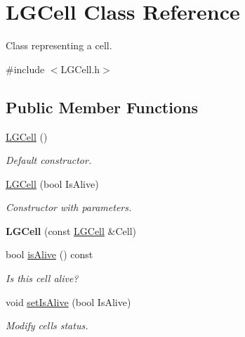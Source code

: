 \hypertarget{class_l_g_cell}{}\section{L\+G\+Cell Class Reference}
\label{class_l_g_cell}


Class representing a cell.  




{\ttfamily \#include $<$L\+G\+Cell.\+h$>$}

\subsection*{Public Member Functions}
\begin{DoxyCompactItemize}
\item 
\hyperlink{class_l_g_cell_a00bae879e0f080c65dc95d5bea436030}{L\+G\+Cell} ()\hypertarget{class_l_g_cell_a00bae879e0f080c65dc95d5bea436030}{}\label{class_l_g_cell_a00bae879e0f080c65dc95d5bea436030}

\begin{DoxyCompactList}\small\item\em Default constructor. \end{DoxyCompactList}\item 
\hyperlink{class_l_g_cell_af88e7ac988bcfee6703f68bf5b73007c}{L\+G\+Cell} (bool Is\+Alive)
\begin{DoxyCompactList}\small\item\em Constructor with parameters. \end{DoxyCompactList}\item 
{\bfseries L\+G\+Cell} (const \hyperlink{class_l_g_cell}{L\+G\+Cell} \&Cell)\hypertarget{class_l_g_cell_a7e6104336ab3b632c7f98cb1ee7e659b}{}\label{class_l_g_cell_a7e6104336ab3b632c7f98cb1ee7e659b}

\item 
bool \hyperlink{class_l_g_cell_afe403299e6c106bfb1db7e9ff1b128c7}{is\+Alive} () const \hypertarget{class_l_g_cell_afe403299e6c106bfb1db7e9ff1b128c7}{}\label{class_l_g_cell_afe403299e6c106bfb1db7e9ff1b128c7}

\begin{DoxyCompactList}\small\item\em Is this cell alive? \end{DoxyCompactList}\item 
void \hyperlink{class_l_g_cell_ad83f1e6e5d683d21317dc0e856d7810f}{set\+Is\+Alive} (bool Is\+Alive)
\begin{DoxyCompactList}\small\item\em Modify cell\textquotesingle{}s status. \end{DoxyCompactList}\end{DoxyCompactItemize}


